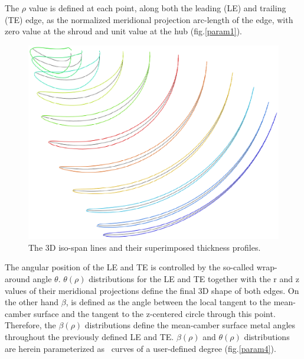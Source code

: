 
The $\rho$ value is defined at each point, along both the leading (LE) and trailing (TE) edge, as the normalized meridional projection arc-length of the edge, with zero value at the shroud and unit value at the hub (fig.\ref{param1}). 

\begin{figure}[h!]
\centering
\includegraphics[width=120mm]{param3.eps} 
\caption{The 3D iso-span lines and their superimposed thickness profiles.}
\label{param3}
\end{figure}

The angular position of the LE and TE is controlled by the so-called wrap-around angle $\theta$. %
$\theta(\rho)$ distributions for the LE and TE together with the r and z values of their meridional projections define the final 3D shape of both edges. On the other hand $\beta$, is defined as the angle between the local tangent to the mean-camber surface and the tangent to the z-centered circle through this point. Therefore, the $\beta(\rho)$ distributions define the mean-camber surface metal angles throughout the previously defined LE and TE. $\beta(\rho)$ and $\theta(\rho)$ distributions are herein parameterized as \Bezier\ curves of a user-defined degree (fig.\ref{param4}).  


